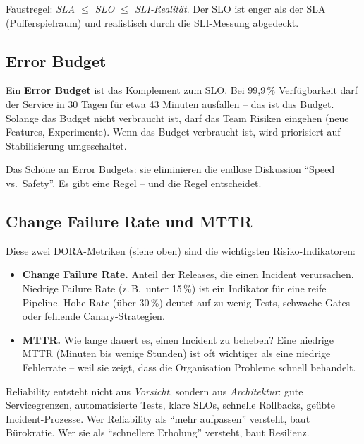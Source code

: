 \documentclass[11pt,a4paper,oneside]{article}
\newcommand{\fachbegriff}[1]{\textbf{#1}}
\begin{document}
Faustregel: \emph{SLA $\leq$ SLO $\leq$ SLI-Realität}. Der SLO ist enger als der SLA (Pufferspielraum) und realistisch durch die SLI-Messung abgedeckt.

\subsection{Error Budget}

Ein \fachbegriff{Error Budget} ist das Komplement zum SLO. Bei 99,9\,\% Verfügbarkeit darf der Service in 30 Tagen für etwa 43 Minuten ausfallen -- das ist das Budget. Solange das Budget nicht verbraucht ist, darf das Team Risiken eingehen (neue Features, Experimente). Wenn das Budget verbraucht ist, wird priorisiert auf Stabilisierung umgeschaltet.

Das Schöne an Error Budgets: sie eliminieren die endlose Diskussion ``Speed vs.\ Safety''. Es gibt eine Regel -- und die Regel entscheidet.

\subsection{Change Failure Rate und MTTR}

Diese zwei DORA-Metriken (siehe oben) sind die wichtigsten Risiko-Indikatoren:

\begin{itemize}
  \item \textbf{Change Failure Rate.} Anteil der Releases, die einen Incident verursachen. Niedrige Failure Rate (z.\,B.\ unter 15\,\%) ist ein Indikator für eine reife Pipeline. Hohe Rate (über 30\,\%) deutet auf zu wenig Tests, schwache Gates oder fehlende Canary-Strategien.
  \item \textbf{MTTR.} Wie lange dauert es, einen Incident zu beheben? Eine niedrige MTTR (Minuten bis wenige Stunden) ist oft wichtiger als eine niedrige Fehlerrate -- weil sie zeigt, dass die Organisation Probleme schnell behandelt.
\end{itemize}

\begin{merkbox}
Reliability entsteht nicht aus \emph{Vorsicht}, sondern aus \emph{Architektur}: gute Servicegrenzen, automatisierte Tests, klare SLOs, schnelle Rollbacks, geübte Incident-Prozesse. Wer Reliability als ``mehr aufpassen'' versteht, baut Bürokratie. Wer sie als ``schnellere Erholung'' versteht, baut Resilienz.
\end{merkbox}

\end{document}
